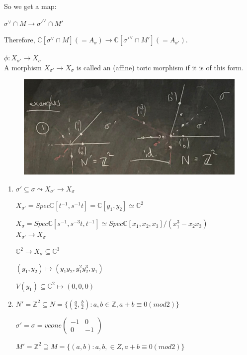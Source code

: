 \documentclass[a4paper,12pt]{amsart}
\newcommand{\C}{\ensuremath{\mathbb{C}}}
\newcommand{\Z}{\ensuremath{\mathbb{Z}}}
\newcommand{\iv}{\ensuremath{^{-1}}}
\begin{document}
So we get a map:

$\sigma^\vee\cap M\to \sigma'^\vee \cap M'$

Therefore, $\C[\sigma^\vee \cap M] (=A_\sigma)\to \C[\sigma'^\vee \cap M'](=A_{\sigma'})$.

$\phi:X_{\sigma'}\to X_\sigma$
\\

A morphism $X_{\sigma'}\to X_\sigma$ is called an (affine) toric morphism if it is of this form.
\\

\begin{Eg}
	\begin{figure}[htbp]\centering
		\includegraphics[scale=0.15]{pic/1}
	\end{figure}
\begin{enumerate}[1)]
	\item $\sigma' \subseteq \sigma\leadsto X_{\sigma'}\to X_\sigma$
	
	$X_{\sigma'}=Spec\C[t\iv, s\iv t]=\C[y_1,y_2]\simeq \C^2$
	
	$X_\sigma = Spec\C[s\iv, s^{-3}t, t\iv] \simeq Spec\C[x_1,x_2,x_3]/(x_1^3-x_2x_3)$
	\\
	
	$X_{\sigma'}\to X_\sigma$
	
	$\C^2\to X_\sigma\subseteq \C^3$
	
	$(y_1,y_2)\mapsto (y_1y_2,y_1^2y_2^3,y_1)$
	
	$V(y_1)\subseteq \C^2 \mapsto (0,0,0)$
	\item  $N'=\Z^2 \subseteq N=\{(\frac{a}{2},\frac{b}{2}): a,b\in \Z, a+b\equiv 0 (mod 2) \}$
	
	$\sigma'=\sigma = vcone \begin{pmatrix} -1 & 0 \\ 0 & -1 \end{pmatrix}$
	
	$M'=\Z^2 \supseteq M= \{(a,b): a,b,\in Z, a+b\equiv 0 (mod2)\}$
	

\end{enumerate}
\end{Eg}
\end{document}
